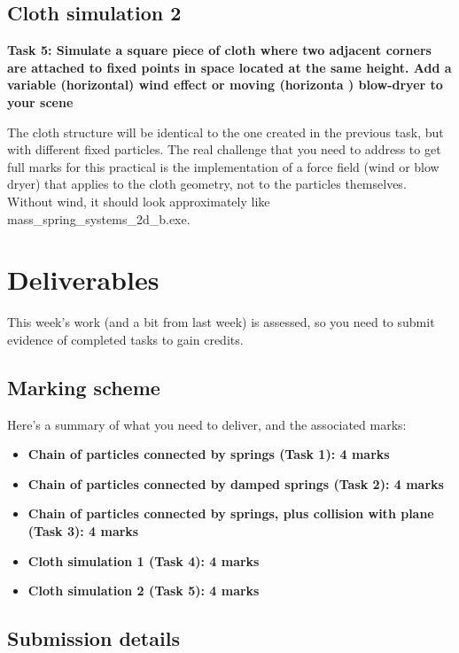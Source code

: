 \documentclass[12pt]{article}
\begin{document}
\subsection*{Cloth simulation 2}

\textbf{Task 5: Simulate a square piece of cloth where two adjacent corners are attached to fixed points in space located at the same height. Add a variable (horizontal) wind effect or moving (horizonta ) blow-dryer to your scene}

The cloth structure will be identical to the one created in the previous task, but with different fixed particles. The real challenge that you need to address to get full marks for this practical is the implementation of a force field (wind or blow dryer) that applies to the cloth geometry, not to the particles themselves. Without wind, it should look approximately like mass\_spring\_systems\_2d\_b.exe.

\section*{Deliverables}

This week's work (and a bit from last week) is assessed, so you need to submit evidence of completed tasks to gain credits.

\subsection*{Marking scheme}

Here's a summary of what you need to deliver, and the associated marks:

\begin{itemize}
\item \textbf{Chain of particles connected by springs (Task 1): 4 marks}
\item \textbf{Chain of particles connected by damped springs (Task 2): 4 marks} 
\item \textbf{Chain of particles connected by springs, plus collision with plane (Task 3): 4 marks}
\item \textbf{Cloth simulation 1 (Task 4): 4 marks}
\item \textbf{Cloth simulation 2 (Task 5): 4 marks} 
\end{itemize}

\subsection*{Submission details}
\end{document}
